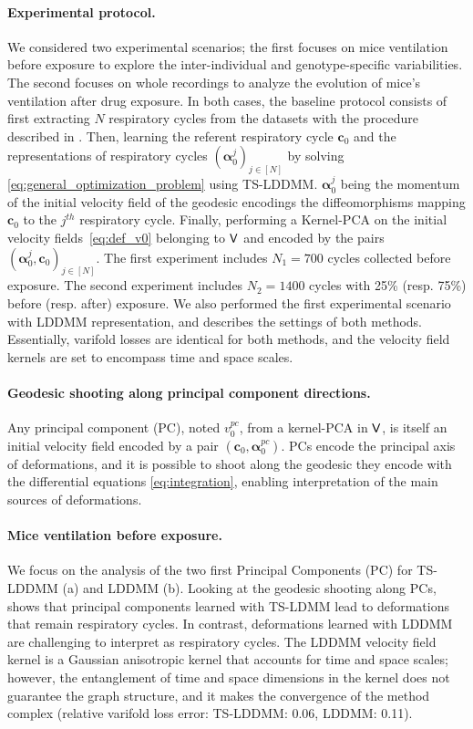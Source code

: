 \paragraph{Experimental protocol.} 
We considered two experimental scenarios; the first focuses on mice ventilation before exposure to explore the inter-individual and genotype-specific variabilities. The second focuses on whole recordings to analyze the evolution of mice's ventilation after drug exposure. In both cases, the baseline protocol consists of first extracting $N$ respiratory cycles from the datasets with the procedure described in \cite{germain2023unsupervised}. Then, learning the referent respiratory cycle $\mathbf{c}_0$ and the representations  of respiratory cycles $(\bm{\alpha}_0^j)_{j \in [N]}$ by solving \eqref{eq:general_optimization_problem} using TS-LDDMM. $\bm{\alpha}_0^j$ being the momentum of the initial velocity field of the geodesic encodings the diffeomorphisms mapping $\mathbf{c}_0$ to the $j^{th}$ respiratory cycle. Finally, performing a Kernel-PCA on the initial velocity fields~\eqref{eq:def_v0} belonging to $\mathsf{V}$ and encoded by the pairs $(\bm{\alpha}_0^j,\mathbf{c}_0)_{j \in [N]}$. The first experiment includes $N_1 = 700$ cycles collected before exposure. The second experiment includes $N_2 = 1400$ cycles with 25\% (resp. 75\%) before (resp. after) exposure. We also performed the first experimental scenario with LDDMM representation, and  describes the settings of both methods. Essentially, varifold losses are identical for both methods, and the velocity field kernels are set to encompass time and space scales. 

\paragraph{Geodesic shooting along principal component directions.}
Any principal component (PC), noted $v_0^{pc}$, from a kernel-PCA in $\mathsf{V}$, is itself an initial velocity field encoded by a pair $(\mathbf{c}_0, \bm{\alpha}_0^{pc})$. PCs encode the principal axis of deformations, and it is possible to shoot along the geodesic they encode with the differential equations \eqref{eq:integration}, enabling interpretation of the main sources of deformations.

\paragraph{Mice ventilation before exposure.}
We focus on the analysis of the two first Principal Components (PC) for TS-LDDMM (a) and LDDMM (b). Looking at the geodesic shooting along PCs,  shows that principal components learned with TS-LDMM lead to deformations that remain respiratory cycles. In contrast, deformations learned with LDDMM are challenging to interpret as respiratory cycles. The LDDMM velocity field kernel is a Gaussian anisotropic kernel that accounts for time and space scales; however, the entanglement of time and space dimensions in the kernel does not guarantee the graph structure, and it makes the convergence of the method complex (relative varifold loss error: TS-LDDMM: 0.06, LDDMM: 0.11).

